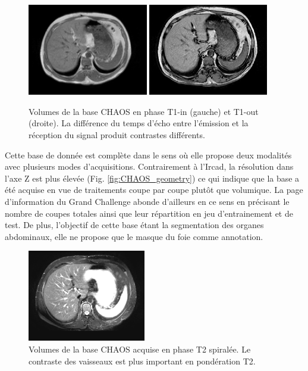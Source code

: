 \begin{figure}
    \centering
    \includegraphics[height=4cm]{Images/T1_in_phase.png}
    \includegraphics[height=4cm]{Images/T1_out_phase.png}
    \caption{Volumes de la base CHAOS en phase T1-in (gauche) et T1-out (droite). La différence du temps d'écho entre l'émission et la réception du signal produit contrastes différents.}
    \label{fig:T1_MRI}
\end{figure}

Cette base de donnée est complète dans le sens où elle propose deux modalités avec plusieurs modes d'acquisitions. Contrairement à l'Ircad, la résolution dans l'axe Z est plus élevée (Fig. \ref{fig:CHAOS_geometry}) ce qui indique que la base a été acquise en vue de traitements coupe par coupe plutôt que volumique. La page d'information du Grand Challenge abonde d'ailleurs en ce sens en précisant le nombre de coupes totales ainsi que leur répartition en jeu d'entrainement et de test. De plus, l'objectif de cette base étant la segmentation des organes abdominaux, elle ne propose que le masque du foie comme annotation.

\begin{figure}
    \centering
    \includegraphics[height=4cm]{Images/T2_SPIR.png}
    \caption{Volumes de la base CHAOS acquise en phase T2 spiralée. Le contraste des vaisseaux est plus important en pondération T2.}
    \label{fig:T2_MRI}
\end{figure}

